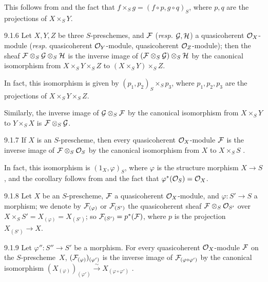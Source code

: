 This follows from  and the fact that $f\times_S g=(f\circ p, g\circ
q)_S$, where $p,q$ are the projections of $X\times_S Y$.

\begin{env}[Corollary]{9.1.6}
Let $X,Y,Z$ be three $S$-preschemes, and
$\mathcal{F}$ (\emph{resp.} $\mathcal{G},\mathcal{H}$) a quasicoherent $\mathcal{O}_X$-module
(\emph{resp.} quasicoherent $\mathcal{O}_Y$-module, quasicoherent $\mathcal{O}_Z$-module); then
the sheaf $\mathcal{F}\otimes_S\mathcal{G}\otimes_S\mathcal{H}$ is the inverse image
of $(\mathcal{F}\otimes_S\mathcal{G})\otimes_S\mathcal{H}$ by the canonical
isomorphism from $X\times_S Y\times_S Z$ to $(X\times_S Y)\times_S Z$.
\end{env}

In fact, this isomorphism is given by $(p_1,p_2)_S\times_S p_3$, where
$p_1,p_2,p_3$ are the projections of $X\times_S Y\times_S Z$.

Similarly, the inverse image of $\mathcal{G}\otimes_S\mathcal{F}$ by the canonical
isomorphism from $X\times_S Y$ to $Y\times_S X$ is
$\mathcal{F}\otimes_S\mathcal{G}$.

\begin{env}[Corollary]{9.1.7}
If $X$ is an $S$-prescheme, then every
quasicoherent $\mathcal{O}_X$-module $\mathcal{F}$ is the inverse image of
$\mathcal{F}\otimes_S\mathcal{O}_S$ by the canonical isomorphism from $X$ to $X\times_S S$
.
\end{env}

In fact, this isomorphism is $(1_X,\varphi)_S$, where $\varphi$ is the structure
morphism $X\to S$, and the corollary follows from  and the fact that
$\varphi^\ast(\mathcal{O}_S)=\mathcal{O}_X$.

\begin{env}{9.1.8}
Let $X$ be an $S$-prescheme, $\mathcal{F}$ a quasicoherent
$\mathcal{O}_X$-module, and $\varphi\colon S'\to S$ a morphism; we denote by
$\mathcal{F}_{(\varphi)}$ or $\mathcal{F}_{(S')}$ the quasicoherent sheaf
$\mathcal{F}\otimes_S\mathcal{O}_{S'}$ over $X\times_S S'=X_{(\varphi)}=X_{(S')}$; so
$\mathcal{F}_{(S')}=p^\ast(\mathcal{F})$, where $p$ is the projection $X_{(S')}\to X$.
\end{env}

\begin{env}[Proposition]{9.1.9}
Let $\varphi''\colon S''\to S'$ be a morphism.
For every quasicoherent $\mathcal{O}_X$-module $\mathcal{F}$ on the $S$-prescheme~$X$,
$(\mathcal{F}_{(\varphi)})_{(\varphi')}$ is the inverse image of
$\mathcal{F}_{(\varphi\circ\varphi')}$ by the canonical isomorphism
$(X_{(\varphi)})_{(\varphi')}\xrightarrow{\sim}X_{(\varphi\circ\varphi')}$
.
\end{env}

